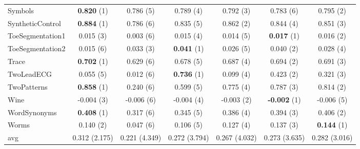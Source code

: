 \begin{table}[ht]
\begin{adjustbox}{width=\textwidth}
\begin{tabular}{lcccccc}
    Symbols & \textbf{0.820} (1) & 0.786 (5) & 0.789 (4) & 0.792 (3) & 0.783 (6) & 0.795 (2) \\
    SyntheticControl & \textbf{0.884} (1) & 0.786 (6) & 0.835 (5) & 0.862 (2) & 0.844 (4) & 0.851 (3) \\
    ToeSegmentation1 & 0.015 (3) & 0.003 (6) & 0.015 (4) & 0.014 (5) & \textbf{0.017} (1) & 0.016 (2) \\
    ToeSegmentation2 & 0.015 (6) & 0.033 (3) & \textbf{0.041} (1) & 0.026 (5) & 0.040 (2) & 0.028 (4) \\
    Trace & \textbf{0.702} (1) & 0.629 (6) & 0.678 (5) & 0.687 (4) & 0.694 (2) & 0.691 (3) \\
    TwoLeadECG & 0.055 (5) & 0.012 (6) & \textbf{0.736} (1) & 0.099 (4) & 0.423 (2) & 0.321 (3) \\
    TwoPatterns & \textbf{0.858} (1) & 0.240 (6) & 0.599 (5) & 0.775 (4) & 0.787 (3) & 0.814 (2) \\
    Wine & -0.004 (3) & -0.006 (6) & -0.004 (4) & -0.003 (2) & \textbf{-0.002} (1) & -0.006 (5) \\
    WordSynonyms & \textbf{0.408} (1) & 0.317 (6) & 0.345 (5) & 0.386 (4) & 0.394 (3) & 0.406 (2) \\
    Worms & 0.140 (2) & 0.047 (6) & 0.106 (5) & 0.127 (4) & 0.137 (3) & \textbf{0.144} (1) \\
    \hline 
    avg & 0.312 (2.175) & 0.221 (4.349) & 0.272 (3.794) & 0.267 (4.032) & 0.273 (3.635) & 0.282 (3.016) \\ 
    \hline
    \end{tabular}
    \end{adjustbox}
    \end{table}
    
    
    
